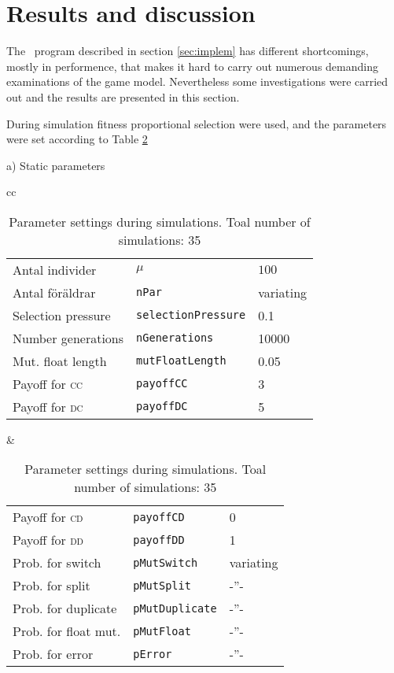 \section{Results and discussion}\label{sec:results}
The \matlab\ program described in section \ref{sec:implem} has different shortcomings, mostly in performence, that makes it hard to carry out numerous demanding examinations of the game model. Nevertheless some investigations were carried out and the results are presented in this section.\mypar

During simulation fitness proportional selection were used, and the parameters were set according to Table \ref{tab:results:parameters}


\begin{table}[!hbtp]
  \footnotesize
  \centering
  \label{tab:results:parameters}
  \caption{Parameter settings during simulations. Toal number of simulations: 35}

  a) Static parameters \myhalfpar

  \begin{tabular}{cc}
    \begin{tabular}{ll@{$~=~$}l}
      \hline
      Antal individer        & $\mu$                      & $100$  \\
      Antal föräldrar        & \texttt{nPar}              & variating \\
      Selection pressure     & \texttt{selectionPressure} & 0.1    \\
      Number generations     & \texttt{nGenerations}      & 10000  \\
      Mut. float length      & \texttt{mutFloatLength}    & 0.05   \\
      Payoff for \textsc{cc} & \texttt{payoffCC}          & 3      \\
      Payoff for \textsc{dc} & \texttt{payoffDC}          & 5      \\
      \hline
    \end{tabular}
    &
    \begin{tabular}{ll@{$~=~$}l}
      \hline
      Payoff for \textsc{cd} & \texttt{payoffCD}          & 0         \\
      Payoff for \textsc{dd} & \texttt{payoffDD}          & 1         \\
      Prob. for switch       & \texttt{pMutSwitch}        & variating \\
      Prob. for split        & \texttt{pMutSplit}         & -''-      \\
      Prob. for duplicate    & \texttt{pMutDuplicate}     & -''-      \\
      Prob. for float mut.   & \texttt{pMutFloat}         & -''-      \\
      Prob. for error        & \texttt{pError}            & -''-      \\
      \hline
    \end{tabular}
  \end{tabular}\mypar


\end{table}

